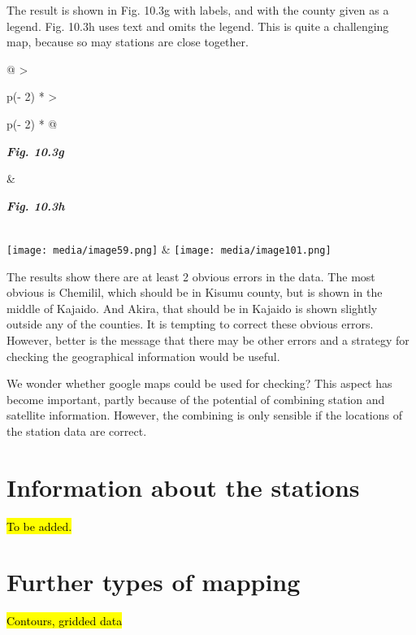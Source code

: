 \documentclass[
  letterpaper,
  DIV=11,
  numbers=noendperiod]{scrreprt}
\begin{document}
The result is shown in Fig. 10.3g with labels, and with the county given
as a legend. Fig. 10.3h uses text and omits the legend. This is quite a
challenging map, because so may stations are close together.

\begin{longtable}[]{@{}
  >{\raggedright\arraybackslash}p{(\columnwidth - 2\tabcolsep) * }
  >{\raggedright\arraybackslash}p{(\columnwidth - 2\tabcolsep) * }@{}}
\toprule\noalign{}
\begin{minipage}[b]{\linewidth}\raggedright
\textbf{\emph{Fig. 10.3g}}
\end{minipage} & \begin{minipage}[b]{\linewidth}\raggedright
\textbf{\emph{Fig. 10.3h}}
\end{minipage} \\
\midrule\noalign{}
\endhead
\bottomrule\noalign{}
\endlastfoot
\texttt{[image: media/image59.png]} &
\texttt{[image: media/image101.png]} \\
\end{longtable}

The results show there are at least 2 obvious errors in the data. The
most obvious is Chemilil, which should be in Kisumu county, but is shown
in the middle of Kajaido. And Akira, that should be in Kajaido is shown
slightly outside any of the counties. It is tempting to correct these
obvious errors. However, better is the message that there may be other
errors and a strategy for checking the geographical information would be
useful.

We wonder whether google maps could be used for checking? This aspect
has become important, partly because of the potential of combining
station and satellite information. However, the combining is only
sensible if the locations of the station data are correct.

\section{Information about the
stations}\label{information-about-the-stations}

\hl{To be added.}

\section{Further types of mapping}\label{further-types-of-mapping}

\hl{Contours, gridded data}
\end{document}
